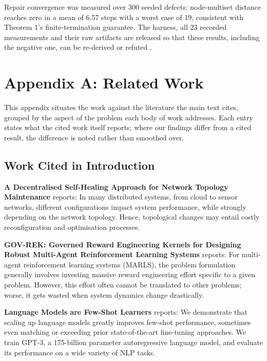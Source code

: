 \documentclass[10pt,twocolumn,letterpaper]{article}
\begin{document}
Repair convergence was measured over 300 seeded defects: node-multiset distance reaches zero in a mean of 6.57 steps with a worst case of 19, consistent with Theorem 1's finite-termination guarantee. The harness, all 23 recorded measurements and their raw artifacts are released so that these results, including the negative one, can be re-derived or refuted \cite{arxiv_2501_02497,arxiv_2405_01543,crossref_10_1145_3689096_3689462}.





\section{Appendix A: Related Work}


This appendix situates the work against the literature the main text cites, grouped by the aspect of the problem each body of work addresses. Each entry states what the cited work itself reports; where our findings differ from a cited result, the difference is noted rather than smoothed over.


\subsection{Work Cited in Introduction}


\textbf{A Decentralised Self-Healing Approach for Network Topology Maintenance} \cite{arxiv_2010_11146} reports: In many distributed systems, from cloud to sensor networks, different configurations impact system performance, while strongly depending on the network topology. Hence, topological changes may entail costly reconfiguration and optimisation processes.

\textbf{GOV-REK: Governed Reward Engineering Kernels for Designing Robust Multi-Agent Reinforcement Learning Systems} \cite{arxiv_2404_01131} reports: For multi-agent reinforcement learning systems (MARLS), the problem formulation generally involves investing massive reward engineering effort specific to a given problem. However, this effort often cannot be translated to other problems; worse, it gets wasted when system dynamics change drastically.

\textbf{Language Models are Few-Shot Learners} \cite{arxiv_2005_14165} reports: We demonstrate that scaling up language models greatly improves few-shot performance, sometimes even matching or exceeding prior state-of-the-art fine-tuning approaches. We train GPT-3, a 175-billion parameter autoregressive language model, and evaluate its performance on a wide variety of NLP tasks.
\end{document}
